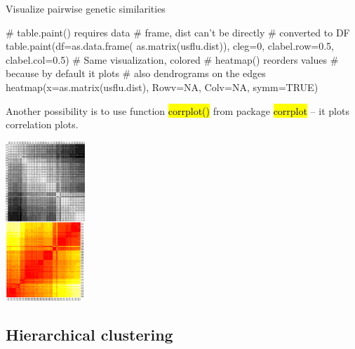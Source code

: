 \documentclass[compress, ucs, xelatex, 11pt, xcolor=svgnames,
  hyperref={
    bookmarks=true,
    unicode=true,
    colorlinks=true,
    pdftitle={Molecular data in R},
    plainpages=false,
    pdfauthor={Vojtech Zeisek},
    pdfsubject={Course about phylogeny and evolution in R},
    pdfcreator={XeLaTeX},
    pdfkeywords={R, evolution, phylogeny, molecular data},
    linkcolor=Tomato,
    anchorcolor=SaddleBrown,
    citecolor=Goldenrod,
    filecolor=DarkMagenta,
    menucolor=Sienna,
    urlcolor=DarkTurquoise,
    pdftex},
  url={hyphens, lowtilde} %
  ]{beamer}
\renewcommand{\texttt}[1]{\hl{\ttfamily #1}}
\begin{document}
\begin{frame}[fragile]{Visualize pairwise genetic similarities}
\begin{multicols}{2}
\vfil
  \begin{spluscode}
    # table.paint() requires data
    # frame, dist can't be directly
    # converted to DF
    table.paint(df=as.data.frame(
      as.matrix(usflu.dist)), cleg=0,
      clabel.row=0.5, clabel.col=0.5)
    # Same visualization, colored
    # heatmap() reorders values
    # because by default it plots
    # also dendrograms on the edges
    heatmap(x=as.matrix(usflu.dist),
      Rowv=NA, Colv=NA, symm=TRUE)
  \end{spluscode}
\vfil
  Another possibility is to use function \texttt{corrplot()} from package \texttt{corrplot} -- it plots correlation plots.
\vfil
  \columnbreak
  \begin{center}
    \includegraphics[height=6cm]{dna-dists.png}
  \end{center}
\end{multicols}
\end{frame}

\subsection{Hierarchical clustering}
\end{document}
